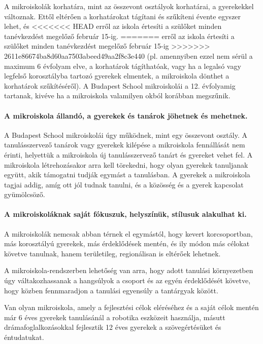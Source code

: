 A mikroiskolák korhatára, mint az összevont osztályok korhatárai, a gyerekekkel
változnak. Ettől eltérően a korhatárokat tágítani és szűkíteni évente egyszer
lehet, és
<<<<<<< HEAD
erről az iskola értesíti a szülőket minden tanévkezdést megelőző február 15-ig.
=======
erről az iskola értesíti a szülőket minden tanévkezdést megelőző február 15-ig
>>>>>>> 2611e86674ba8d60aa7503abeed49aa2f8c3e440
(pl. amennyiben ezzel nem sérül a maximum 6 évfolyam elve, a korhatárok
tágíthatóak, vagy ha a legalsó vagy legfelső korosztályba tartozó gyerekek
elmentek, a mikroiskola dönthet a korhatárok szűkítéséről).
A Budapest School mikroiskolái a 12. évfolyamig tartanak, kivéve ha a
mikroiskola valamilyen okból korábban megszűnik.

\paragraph{A mikroiskola állandó, a gyerekek és tanárok jöhetnek és mehetnek.}
A Budapest School mikroiskolái úgy működnek, mint egy összevont osztály. A
tanulásszervező tanárok vagy gyerekek kilépése a mikroiskola fennállását nem
érinti, helyettük a mikroiskola új tanulásszervező tanárt és
gyereket vehet fel.  A mikroiskola létrehozásakor arra kell törekedni, hogy
olyan
gyerekek tanuljanak együtt, akik támogatni tudják egymást a tanulásban. A
gyerekek a mikroiskola tagjai addig, amíg ott jól tudnak tanulni, és a közösség
és a gyerek kapcsolat gyümölcsöző.

\paragraph{A mikroiskoláknak saját fókuszuk, helyszínük, stílusuk alakulhat
      ki.}
A mikroiskolák nemcsak abban térnek el egymástól, hogy kevert korcsoportban,
más korosztályú gyerekek, más érdeklődések mentén, és ily módon más célokat
követve tanulnak, hanem területileg, regionálisan is eltérőek lehetnek.

A mikroiskola-rendszerben lehetőség van arra, hogy adott tanulási környezetben
úgy váltakozhassanak a hangsúlyok a csoport és az egyén érdeklődését követve,
hogy közben
fennmaradjon a tanulási egyensúly a tantárgyak között.

Van olyan mikroiskola, amely a fejlesztési célok eléréséhez és a saját célok
mentén már 6 éves gyerekek tanulásánál a robotika eszközeit használja, másutt
drámafoglalkozásokkal fejlesztik 12 éves gyerekek a szövegértésüket és
éntudatukat.



